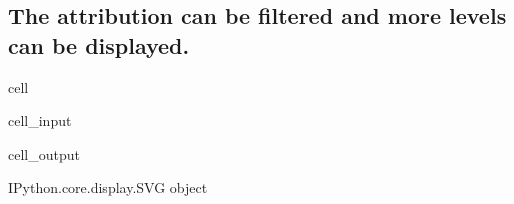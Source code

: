 \documentclass[letterpaper,10pt,english]{jupyterBook}
\begin{document}
\subsection{The attribution can be filtered and more levels can be displayed.}
\label{\detokenize{content/06_ModelAnalytics/Attribution:the-attribution-can-be-filtered-and-more-levels-can-be-displayed}}
\begin{sphinxuseclass}{cell}\begin{sphinxVerbatimInput}

\begin{sphinxuseclass}{cell_input}
\begin{sphinxVerbatim}[commandchars=\\\{\}]
\PYG{p}{[}\PYG{p}{]} 
\end{sphinxVerbatim}

\end{sphinxuseclass}\end{sphinxVerbatimInput}
\begin{sphinxVerbatimOutput}

\begin{sphinxuseclass}{cell_output}
\begin{sphinxVerbatim}[commandchars=\\\{\}]
\PYGZlt{}IPython.core.display.SVG object\PYGZgt{}
\end{sphinxVerbatim}

\end{sphinxuseclass}\end{sphinxVerbatimOutput}

\end{sphinxuseclass}
\end{document}
